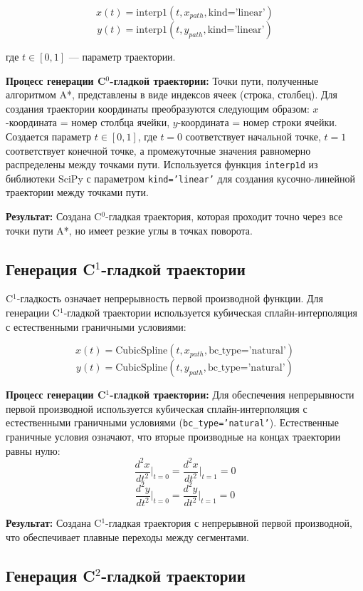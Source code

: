 $$x(t) = \text{interp1}(t, x_{path}, \text{kind='linear'})$$
$$y(t) = \text{interp1}(t, y_{path}, \text{kind='linear'})$$

где $t \in [0, 1]$ --- параметр траектории.

\textbf{Процесс генерации C$^0$-гладкой траектории:} Точки пути, полученные алгоритмом A*, представлены в виде индексов ячеек (строка, столбец). Для создания траектории координаты преобразуются следующим образом: $x$-координата = номер столбца ячейки, $y$-координата = номер строки ячейки. Создается параметр $t \in [0, 1]$, где $t = 0$ соответствует начальной точке, $t = 1$ соответствует конечной точке, а промежуточные значения равномерно распределены между точками пути. Используется функция \texttt{interp1d} из библиотеки SciPy с параметром \texttt{kind='linear'} для создания кусочно-линейной траектории между точками пути.

\textbf{Результат:} Создана C$^0$-гладкая траектория, которая проходит точно через все точки пути A*, но имеет резкие углы в точках поворота.

\subsection{Генерация C$^1$-гладкой траектории}

C$^1$-гладкость означает непрерывность первой производной функции. Для генерации C$^1$-гладкой траектории используется кубическая сплайн-интерполяция с естественными граничными условиями:

$$x(t) = \text{CubicSpline}(t, x_{path}, \text{bc\_type='natural'})$$
$$y(t) = \text{CubicSpline}(t, y_{path}, \text{bc\_type='natural'})$$

\textbf{Процесс генерации C$^1$-гладкой траектории:} Для обеспечения непрерывности первой производной используется кубическая сплайн-интерполяция с естественными граничными условиями (\texttt{bc\_type='natural'}). Естественные граничные условия означают, что вторые производные на концах траектории равны нулю:
$$\frac{d^2x}{dt^2}\bigg|_{t=0} = \frac{d^2x}{dt^2}\bigg|_{t=1} = 0$$
$$\frac{d^2y}{dt^2}\bigg|_{t=0} = \frac{d^2y}{dt^2}\bigg|_{t=1} = 0$$

\textbf{Результат:} Создана C$^1$-гладкая траектория с непрерывной первой производной, что обеспечивает плавные переходы между сегментами.

\subsection{Генерация C$^2$-гладкой траектории}

